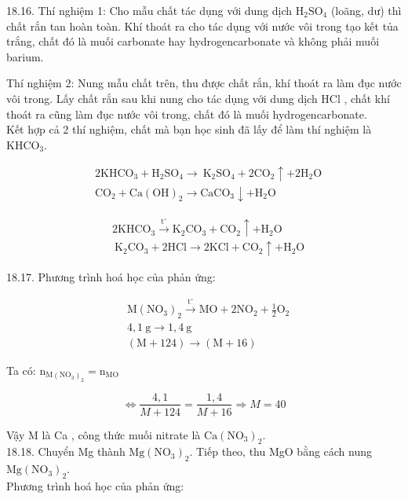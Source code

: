 \documentclass[10pt]{article}
\begin{document}
18.16. Thí nghiệm 1: Cho mẫu chất tác dụng với dung dịch $\mathrm{H}_{2} \mathrm{SO}_{4}$ (loãng, dư) thì chất rắn tan hoàn toàn. Khí thoát ra cho tác dụng với nước vôi trong tạo kết tủa trắng, chất đó là muối carbonate hay hydrogencarbonate và không phải muối barium.

Thí nghiệm 2: Nung mẫu chất trên, thu được chất rắn, khí thoát ra làm đục nước vôi trong. Lấy chất rắn sau khi nung cho tác dụng với dung dịch HCl , chất khí thoát ra cũng làm đục nước vôi trong, chất đó là muối hydrogencarbonate.\\
Kết hợp cả 2 thí nghiệm, chất mà bạn học sinh đã lấy để làm thí nghiệm là $\mathrm{KHCO}_{3}$.

$$
\begin{aligned}
& 2 \mathrm{KHCO}_{3}+\mathrm{H}_{2} \mathrm{SO}_{4} \rightarrow \mathrm{~K}_{2} \mathrm{SO}_{4}+2 \mathrm{CO}_{2} \uparrow+2 \mathrm{H}_{2} \mathrm{O} \\
& \mathrm{CO}_{2}+\mathrm{Ca}(\mathrm{OH})_{2} \rightarrow \mathrm{CaCO}_{3} \downarrow+\mathrm{H}_{2} \mathrm{O}
\end{aligned}
$$

$$
\begin{aligned}
& 2 \mathrm{KHCO}_{3} \xrightarrow{\mathrm{t}^{\circ}} \mathrm{K}_{2} \mathrm{CO}_{3}+\mathrm{CO}_{2} \uparrow+\mathrm{H}_{2} \mathrm{O} \\
& \mathrm{~K}_{2} \mathrm{CO}_{3}+2 \mathrm{HCl} \rightarrow 2 \mathrm{KCl}+\mathrm{CO}_{2} \uparrow+\mathrm{H}_{2} \mathrm{O}
\end{aligned}
$$

18.17. Phương trình hoá học của phản ứng:

$$
\begin{aligned}
& \mathrm{M}\left(\mathrm{NO}_{3}\right)_{2} \xrightarrow{\mathrm{t}^{\circ}} \mathrm{MO}+2 \mathrm{NO}_{2}+\frac{1}{2} \mathrm{O}_{2} \\
& 4,1 \mathrm{~g} \rightarrow 1,4 \mathrm{~g} \\
& (\mathrm{M}+124) \rightarrow(\mathrm{M}+16)
\end{aligned}
$$

Ta có: $\mathrm{n}_{\mathrm{M}\left(\mathrm{NO}_{3}\right)_{2}}=\mathrm{n}_{\mathrm{MO}}$

$$
\Leftrightarrow \frac{4,1}{M+124}=\frac{1,4}{M+16} \Rightarrow M=40
$$

Vậy M là Ca , công thức muối nitrate là $\mathrm{Ca}\left(\mathrm{NO}_{3}\right)_{2}$.\\
18.18. Chuyển Mg thành $\mathrm{Mg}\left(\mathrm{NO}_{3}\right)_{2}$. Tiếp theo, thu MgO bằng cách nung $\mathrm{Mg}\left(\mathrm{NO}_{3}\right)_{2}$.\\
Phương trình hoá học của phản ứng:
\end{document}
